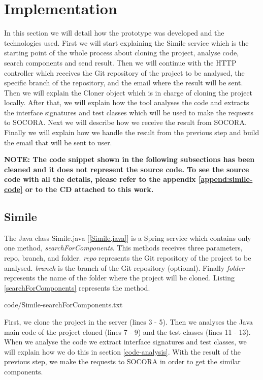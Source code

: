 \section{Implementation}
In this section we will detail how the prototype was developed and the technologies used. First we will start explaining the Simile service which is the starting point of the whole process about cloning the project, analyse code, search components and send result. Then we will continue with the  HTTP controller which receives the Git repository of the project to be analysed, the specific branch of the repository, and the email where the result will be sent. Then we will explain the Cloner object which is in charge of cloning the project locally. After that, we will explain how the tool analyses the code and extracts the interface signatures and test classes which will be used to make the requests to SOCORA. Next we will describe how we receive the result from SOCORA. Finally we will explain how we handle the result from the previous step and build the email that will be sent to user.

\textbf{NOTE: The code snippet shown in the following subsections has been cleaned and it does not represent the source code. To see the source code with all the details, please refer to the appendix \ref{append:simile-code} or to the CD attached to this work.}

\subsection{Simile}
The Java class Simile.java [\ref{Simile.java}] is a Spring service which contains only one method, \emph{searchForComponents}. This methods receives three parameters, repo, branch, and folder. \emph{repo} represents the Git repository of the project to be analysed. \emph{branch} is the branch of the Git repository (optional). Finally \emph{folder} represents the name of the folder where the project will be cloned. Listing \ref{searchForComponents} represents the method.


{code/Simile-searchForComponents.txt}

First, we clone the project in the server (lines 3 - 5). Then we analyses the Java main code of the project cloned (lines 7 - 9) and the test classes (lines 11 - 13). When we analyse the code we extract interface signatures and test classes, we will explain how we do this in section \ref{code-analysis}. With the result of the previous step, we make the requests to SOCORA in order to get the similar components.

